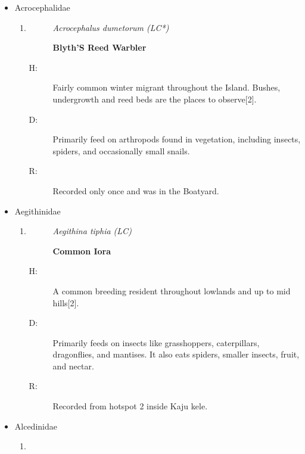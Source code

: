 \begin{itemize}
\begin{enumerate}
\begin{description}
\item[R: ]%
Observed only once in the boat yard at the opposite bank.%
\end{description}%
\end{enumerate}%
\item%
Acrocephalidae%
\begin{enumerate}%
\item%
\begin{description}%
\item[]%
\textit{Acrocephalus dumetorum (LC*)}%
\item[]%
\textbf{Blyth'S Reed Warbler}%
\end{description}%
\begin{description}%
\item[H: ]%
Fairly common winter migrant throughout the Island. Bushes, undergrowth and reed beds are the places to observe{[}2{]}.%
\item[D: ]%
Primarily feed on arthropods found in vegetation, including insects, spiders, and occasionally small snails.%
\item[R: ]%
Recorded only once and was in the Boatyard.%
\end{description}%
\end{enumerate}%
\item%
Aegithinidae%
\begin{enumerate}%
\item%
\begin{description}%
\item[]%
\textit{Aegithina tiphia (LC)}%
\item[]%
\textbf{Common Iora}%
\end{description}%
\begin{description}%
\item[H: ]%
A common breeding resident throughout lowlands and up to mid hills{[}2{]}.%
\item[D: ]%
Primarily feeds on insects like grasshoppers, caterpillars, dragonflies, and mantises. It also eats spiders, smaller insects, fruit, and nectar.%
\item[R: ]%
Recorded from hotspot 2 inside Kaju kele.%
\end{description}%
\end{enumerate}%
\item%
Alcedinidae%
\begin{enumerate}%
\item%
\begin{description}%
\item[]%

\end{description}
\end{enumerate}
\end{itemize}
